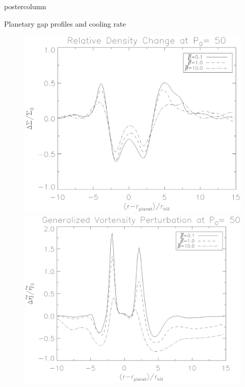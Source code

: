 \documentclass[final,hyperref={pdfpagelabels=false}]{beamer}
\begin{document}
\begin{frame}
\begin{columns}
\begin{column}{.49\textwidth}
\begin{beamercolorbox}[center,wd=\textwidth]{postercolumn}
\begin{minipage}[T]{.95\textwidth}
{        \begin{block}{{\Large Planetary gap profiles and cooling
              rate}}
          \justifying
          \begin{minipage}[t]{0.49\textwidth}
            \begin{figure}
              \includegraphics[width=.99\textwidth,clip=true,trim=0.5cm
                2cm 0cm 1cm]{Posterfig_Density}\\
              \includegraphics[width=.99\textwidth,clip=true,trim=0.5cm
                0.5cm 0cm 1cm]{Posterfig_Vortensity}

\end{figure}
\end{minipage}
\end{block}}
\end{minipage}
\end{beamercolorbox}
\end{column}
\end{columns}
\end{frame}
\end{document}
